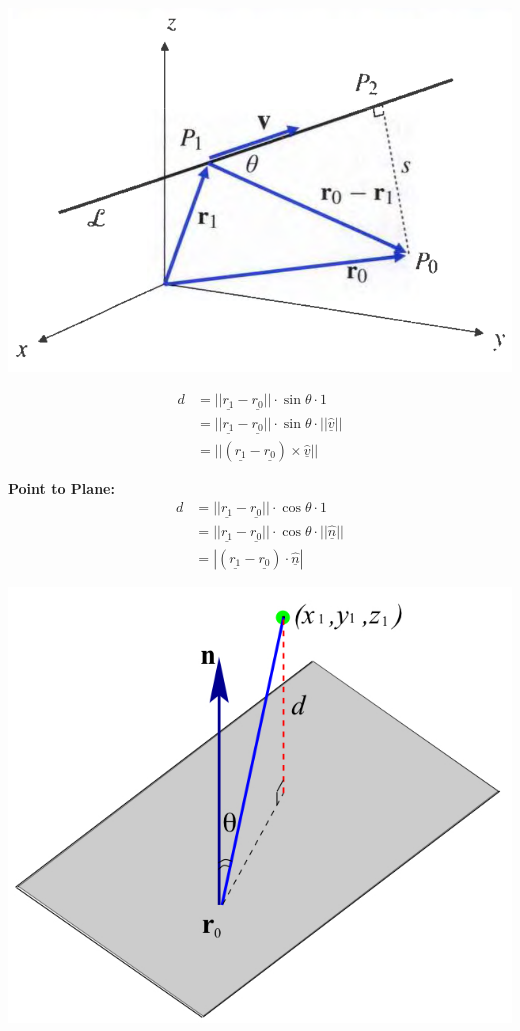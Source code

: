 \documentclass[11pt, a4paper]{MATH2023}
\newcommand{\vct}{\underline}
\newcommand{\vv}{\underline{v}}
\begin{document}
\begin{spacing}{1.3}
    \begin{center}
        \includegraphics[scale=0.4]{images/Ch10-dist-point-line.png}
    \end{center}
    \begin{align*}
        d &= ||\vct{r_1}-\vct{r_0}||\cdot \sin\theta \cdot 1\\
         &= ||\vct{r_1}-\vct{r_0}||\cdot \sin\theta \cdot ||\hat{\vv}||\\
         &= ||(\vct{r_1}-\vct{r_0})\times \hat{\vv}||
    \end{align*}

    {\bf Point to Plane:} 
    \begin{align*}
        d &= ||\vct{r_1}-\vct{r_0}||\cdot \cos\theta \cdot 1\\
         &= ||\vct{r_1}-\vct{r_0}||\cdot \cos\theta \cdot ||\hat{\vct{n}}||\\
         &= | (\vct{r_1}-\vct{r_0})\cdot \hat{\vct{n}} |
    \end{align*}
    \begin{center}
        \includegraphics[scale=0.3]{images/Ch10-dist-point-plane-2.jpeg}
    \end{center}



\end{spacing}
\end{document}
